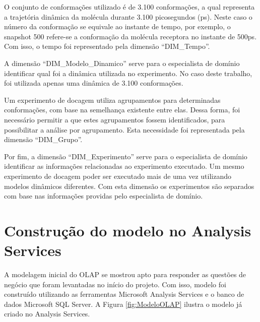 O conjunto de conformações utilizado é de 3.100 conformações, a qual representa a trajetória dinâmica da molécula durante 3.100 picosegundos (ps). Neste caso o número da conformação se equivale ao instante de tempo, por exemplo, o snapshot 500 refere-se a conformação da molécula receptora no instante de 500ps. Com isso, o tempo foi representado pela dimensão ``DIM\_Tempo''. 

A dimensão ``DIM\_Modelo\_Dinamico'' serve para o especialista de domínio identificar qual foi a dinâmica utilizada no experimento. No caso deste trabalho, foi utilizada apenas uma dinâmica de 3.100 conformações.

Um experimento de docagem utiliza agrupamentos para determinadas conformações, com base na semelhança existente entre elas. Dessa forma, foi necessário permitir a que estes agrupamentos fossem identificados, para possibilitar a análise por agrupamento. Esta necessidade foi representada pela dimensão ``DIM\_Grupo''.

Por fim, a dimensão ``DIM\_Experimento'' serve para o especialista de domínio identificar as informações relacionadas ao experimento executado. Um mesmo experimento de docagem poder ser executado mais de uma vez utilizando modelos dinâmicos diferentes. Com esta dimensão os experimentos são separados com base nas informações providas pelo especialista de domínio.


\section{Construção do modelo no Analysis Services}

A modelagem inicial do OLAP se mostrou apto para responder as questões de negócio que foram levantadas no início do projeto. Com isso, modelo foi construído utilizando as ferramentas Microsoft Analysis Services e o banco de dados Microsoft SQL Server. A Figura \ref{fig:ModeloOLAP} ilustra o modelo já criado no Analysis Services.

